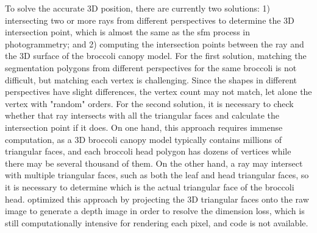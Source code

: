 To solve the accurate 3D position, there are currently two solutions: 1) intersecting two or more rays from different perspectives to determine the 3D intersection point, which is almost the same as the \gls{sfm} process in photogrammetry; and 2) computing the intersection points between the ray and the 3D surface of the broccoli canopy model. For the first solution, matching the segmentation polygons from different perspectives for the same broccoli is not difficult, but matching each vertex is challenging. Since the shapes in different perspectives have slight differences, the vertex count may not match, let alone the vertex with "random" orders. For the second solution, it is necessary to check whether that ray intersects with all the triangular faces and calculate the intersection point if it does. On one hand, this approach requires immense computation, as a 3D broccoli canopy model typically contains millions of triangular faces, and each broccoli head polygon has dozens of vertices while there may be several thousand of them. On the other hand, a ray may intersect with multiple triangular faces, such as both the leaf and head triangular faces, so it is necessary to determine which is the actual triangular face of the broccoli head. \citet{shao_cattle_2020} optimized this approach by projecting the 3D triangular faces onto the raw image to generate a depth image in order to resolve the dimension loss, which is still computationally intensive for rendering each pixel, and code is not available.

